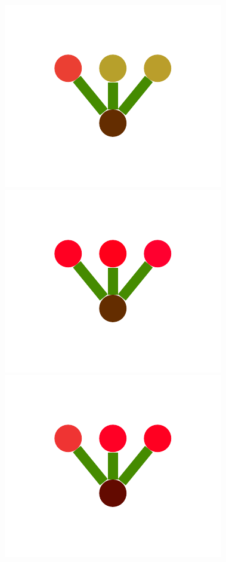 \documentclass[a4paper,10pt]{article}
\begin{document}
\begin{figure}
{    \includegraphics[scale=.2]{./figures/6-2-multiple-color-flower-data-3.pdf}
    \includegraphics[scale=.2]{./figures/6-2-multiple-color-flower-data-4.pdf}
    \includegraphics[scale=.2]{./figures/6-2-multiple-color-flower-data-5.pdf}
}
\end{figure}
\end{document}
